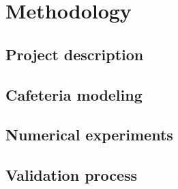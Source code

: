 \chapter{Methodology}
\label{chap:methodology}

 
 
 \section{Project description}
 
 \section{Cafeteria modeling}
 
 \section{Numerical experiments}
 
 \section{Validation process}
 
